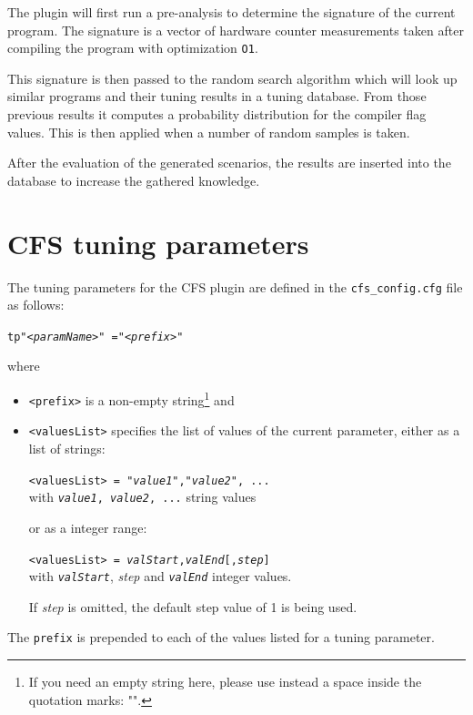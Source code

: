 \documentclass[11pt,a4paper, oneside]{book} %
\begin{document}
The plugin will first run a pre-analysis to determine the signature of the current program. The signature is a vector of hardware counter measurements taken after compiling the program with optimization {\tt O1}.

This signature is then passed to the random search algorithm which will look up similar programs and their tuning results in a tuning database. From those previous results it computes a probability distribution for the compiler flag values. This is then applied when a number of random samples is taken.

After the evaluation of the generated scenarios, the results are inserted into the database to increase the gathered knowledge.


\section{CFS tuning parameters}

The tuning parameters for the CFS plugin are defined in the \texttt{cfs\_config.cfg} file as follows:

\begin{center}
\begin{minipage}{0.8\textwidth}
\texttt{tp\textvisiblespace"\textit{<paramName>}"
\textvisiblespace=\textvisiblespace"\textit{<prefix>}"
}
\end{minipage}
\end{center}

where

\begin{itemize}
	\item \texttt{<prefix>} is a non-empty string\footnote{If you need an empty string here, please use instead a space inside the quotation marks: "\textvisiblespace".} and
	\item \texttt{<valuesList>} specifies the list of values of the current parameter, either as a list of strings:
	\begin{center}
        \begin{minipage}{0.8\textwidth}
		\texttt{<valuesList> = "\textit{value1}","\textit{value2}", ...} \\
with \texttt{\textit{value1}, \textit{value2}, ...} string values
        \end{minipage}
	\end{center}
or as a integer range:
\begin{center}
\begin{minipage}{0.8\textwidth}
\texttt{<valuesList> = \textit{valStart},\textit{valEnd}[,\textit{step}]} \\
with \texttt{\textit{valStart}}, \textit{step} and \texttt{\textit{valEnd}} integer values.
\end{minipage}
\end{center}
If \textit{step} is omitted, the default step value of 1 is being used.

\end{itemize}
The \texttt{prefix} is prepended to each of the values listed for a tuning parameter.
\end{document}
